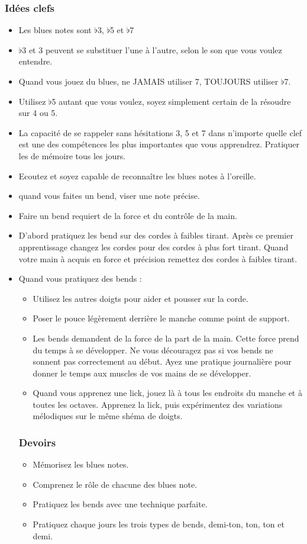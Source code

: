 \documentclass[a4paper]{book}
\begin{document}
\subsubsection{Idées clefs}
\begin{itemize}
\item Les blues notes sont $\flat$3, $\flat$5 et $\flat$7
\item $\flat$3 et 3 peuvent se substituer l'une à l'autre, selon le son que vous voulez entendre.
\item Quand vous jouez du blues, ne JAMAIS utiliser 7, TOUJOURS utiliser $\flat$7.
\item Utilisez $\flat$5 autant que vous voulez, soyez simplement certain de la résoudre sur 4 ou 5.
\item La capacité de se rappeler sans hésitations 3, 5 et 7 dans n'importe quelle clef est une des compétences les plus importantes que vous apprendrez. Pratiquer les de mémoire tous les jours.
\item Ecoutez et soyez capable de reconnaître les blues notes à l'oreille.
\item quand vous faites un bend, viser une note précise.
\item Faire un bend requiert de la force et du contrôle de la main.
\item D'abord pratiquez les bend sur des cordes à faibles tirant. Après ce premier apprentissage changez les cordes pour des cordes à plus fort tirant. Quand votre main à acquis en force et précision remettez des cordes à faibles tirant.
\item Quand vous pratiquez des bends :
\begin{itemize}
\item Utilisez les autres doigts pour aider et pousser sur la corde.
\item Poser le pouce légèrement derrière le manche comme point de support.
\item Les bends demandent de la force de la part de la main. Cette force prend du temps à se développer. Ne vous découragez pas si vos bends ne sonnent pas correctement au début. Ayez une pratique journalière pour donner le temps aux muscles de vos mains de se développer.
\item Quand vous apprenez une lick, jouez là à tous les endroits du manche et à toutes les octaves. Apprenez la lick, puis expérimentez des variations mélodiques sur le même shéma de doigts.
\end{itemize}
\subsubsection{Devoirs}
\begin{itemize}
\item Mémorisez les blues notes.
\item Comprenez le rôle de chacune des blues note.
\item Pratiquez les bends avec une technique parfaite.
\item Pratiquez chaque jours les trois types de bends, demi-ton, ton, ton et demi.
\end{itemize}
\end{itemize}
\end{document}
